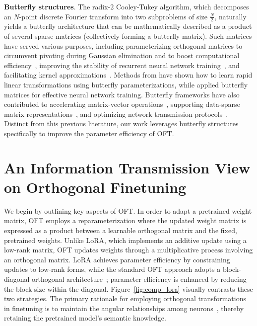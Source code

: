 \textbf{Butterfly structures}. The radix-2 Cooley-Tukey algorithm, which decomposes an $N$-point discrete Fourier transform into two subproblems of size $\frac{N}{2}$, naturally yields a butterfly architecture that can be mathematically described as a product of several sparse matrices (collectively forming a butterfly matrix). Such matrices have served various purposes, including parameterizing orthogonal matrices to circumvent pivoting during Gaussian elimination and to boost computational efficiency~\cite{parker1995random}, improving the stability of recurrent neural network training~\cite{jing2017tunable}, and facilitating kernel approximations~\cite{munkhoeva2018quadrature}. Methods from \cite{dao2019learning,dao2019kaleidoscope} have shown how to learn rapid linear transformations using butterfly parameterizations, while \cite{chen2022pixelated,dao2022monarch} applied butterfly matrices for effective neural network training. Butterfly frameworks have also contributed to accelerating matrix-vector operations~\cite{michielssen1996multilevel,o2010algorithm}, supporting data-sparse matrix representations~\cite{li2015butterfly}, and optimizing network transmission protocols~\cite{klasing1994broadcasting,li2003linear,rajasingh2016transmission}. Distinct from this previous literature, our work leverages butterfly structures specifically to improve the parameter efficiency of OFT.

\section{An Information Transmission View on Orthogonal Finetuning}

We begin by outlining key aspects of OFT. In order to adapt a pretrained weight matrix, OFT employs a reparameterization where the updated weight matrix is expressed as a product between a learnable orthogonal matrix and the fixed, pretrained weights. Unlike LoRA, which implements an additive update using a low-rank matrix, OFT updates weights through a multiplicative process involving an orthogonal matrix. LoRA achieves parameter efficiency by constraining updates to low-rank forms, while the standard OFT approach adopts a block-diagonal orthogonal architecture~\cite{qiu2023controlling}; parameter efficiency is enhanced by reducing the block size within the diagonal. Figure~\ref{fig:comp_lora} visually contrasts these two strategies. The primary rationale for employing orthogonal transformations in finetuning is to maintain the angular relationships among neurons~\cite{liu2018learning,liu2021orthogonal,qiu2023controlling}, thereby retaining the pretrained model's semantic knowledge.

